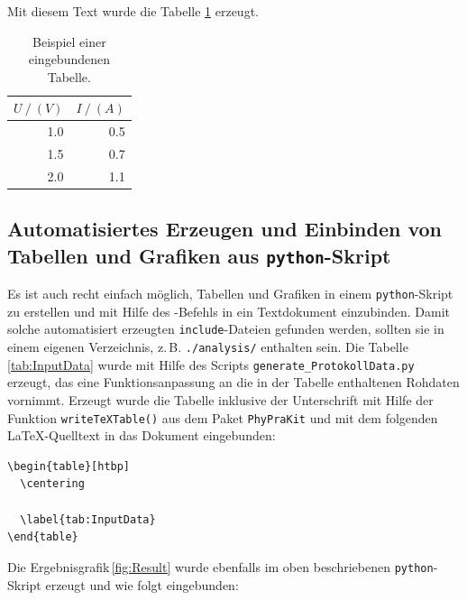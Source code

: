 \documentclass[a4paper,10pt]{article}
\begin{document}
Mit diesem Text wurde die Tabelle \ref{tab:tabelle1} erzeugt.  
\begin{table}[htbp]
  \centering
     \begin{tabular}{rr}
	\toprule
	$U ~/~ (V)$ & $I ~/~ (A)$\\
	\midrule
         1.0 & 0.5 \\
         1.5 & 0.7 \\
         2.0 & 1.1 \\
	\bottomrule
      \end{tabular}
    \caption{Beispiel einer eingebundenen Tabelle.}
    \label{tab:tabelle1}
\end{table}

\newpage

\subsection{Automatisiertes Erzeugen und Einbinden von Tabellen und Grafiken aus \texttt{python}-Skript}

Es ist auch recht einfach möglich, Tabellen und Grafiken
in einem \verb|python|-Skript zu erstellen und mit Hilfe des
\verb||-Befehls in ein Textdokument einzubinden.
Damit solche automatisiert erzeugten \texttt{include}-Dateien
gefunden werden, sollten sie in einem eigenen Verzeichnis,
z.\,B. \texttt{./analysis/} enthalten sein.
Die Tabelle\,\ref{tab:InputData} wurde mit Hilfe des Scripts
\verb|generate_ProtokollData.py| erzeugt, das eine Funktionsanpassung
an die in der Tabelle enthaltenen Rohdaten vornimmt. 
Erzeugt wurde die Tabelle inklusive der Unterschrift mit Hilfe der
Funktion \verb|writeTeXTable()| aus dem Paket \verb|PhyPraKit|
und mit dem folgenden \LaTeX-Quelltext in das Dokument eingebunden:

\begin{verbatim}
\begin{table}[htbp]
  \centering
  
  \label{tab:InputData}
\end{table}
\end{verbatim}

\begin{table}[htbp]
  \centering
  
  \label{tab:InputData}
\end{table}

Die Ergebnisgrafik\,\ref{fig:Result} wurde ebenfalls im oben beschriebenen
\texttt{python}-Skript erzeugt und wie folgt eingebunden:
\end{document}

